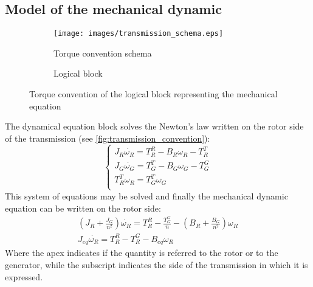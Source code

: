 \subsection[Mechanical dynamic]{Model of the mechanical dynamic}
\begin{figure}
  \centering
  \begin{subfigure}{0.6\columnwidth}
    \centering
    \texttt{[image: images/transmission\_schema.eps]}
    \caption{Torque convention schema}
    \label{fig:transmission_convention}
  \end{subfigure}
  
  \begin{subfigure}{0.5\columnwidth}
    \centering
      
      \caption{Logical block}
    \label{fig:d_mech_equation_block}
  \end{subfigure}
  \caption{Torque convention of the logical block representing the mechanical equation}
\end{figure}
The dynamical equation block solves the Newton's law written on the rotor side of the transmission (see \autoref{fig:transmission_convention}):
\begin{equation}
    \begin{cases}
      J_R \dot{\omega_R} = T_R^R - B_R\omega_R - T_R^T\\
      J_G \dot{\omega_G} = T_G^T - B_G\omega_G - T_G^G\\
      T_R^T\omega_R = T_G^T\omega_G\\
    \end{cases}
\end{equation}
This system of equations may be solved and finally the mechanical dynamic equation can be written on the rotor side:
\begin{gather}
    \left(J_R + \frac{J_G}{n^2}\right) \dot{\omega_R} = T_R^R - \frac{T_G^G}{n} - \left(B_R + \frac{B_G}{n^2}\right)\omega_R \\
    J_{eq} \dot{\omega_R} = T_R^R - T_R^G - B_{eq}\omega_R
    \label{eq:mech_eq}
\end{gather}
Where the apex indicates if the quantity is referred to the rotor or to the generator, while the subscript indicates the side of the transmission in which it is expressed.

